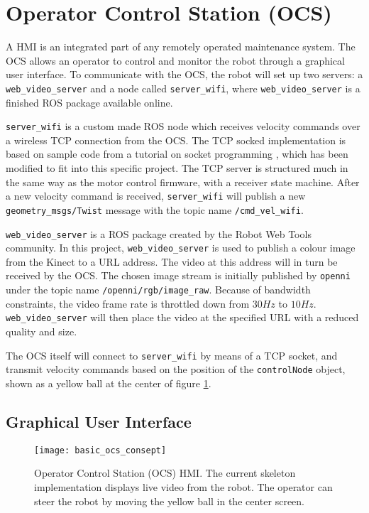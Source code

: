 \section{Operator Control Station (OCS)}

A \ac{HMI} is an integrated part of any remotely operated maintenance system. The \ac{OCS} allows an operator to control and monitor the robot through a graphical user interface. To communicate with the \ac{OCS}, the robot will set up two servers: a \texttt{web\_video\_server} and a node called \texttt{server\_wifi}, where \texttt{web\_video\_server} is a finished \ac{ROS} package available online.

\texttt{server\_wifi} is a custom made \ac{ROS} node which receives velocity commands over a wireless TCP connection from the \ac{OCS}. The TCP socked implementation is based on sample code from a tutorial on socket programming \cite{tcp_tut}, which has been modified to fit into this specific project. The TCP server is structured much in the same way as the motor control firmware, with a receiver state machine. After a new velocity command is received, \texttt{server\_wifi} will publish a new \texttt{geometry\_msgs/Twist} message with the topic name \texttt{/cmd\_vel\_wifi}.

\texttt{web\_video\_server} is a \ac{ROS} package created by the Robot Web Tools community. In this project, \texttt{web\_video\_server} is used to publish a colour image from the Kinect to a URL address. The video at this address will in turn be received by the \ac{OCS}. The chosen image stream is initially published by \texttt{openni} under the topic name \texttt{/openni/rgb/image\_raw}. Because of bandwidth constraints, the video frame rate is throttled down from $30 Hz$ to $10 Hz$.  \texttt{web\_video\_server} will then place the video at the specified URL with a reduced quality and size. 

The \ac{OCS} itself will connect to \texttt{server\_wifi} by means of a TCP socket, and transmit velocity commands based on the position of the \texttt{controlNode} object, shown as a yellow ball at the center of figure \ref{fig:ocs}.

\subsection{Graphical User Interface}

\begin{figure}[H]
	\centering
	\texttt{[image: basic\_ocs\_consept]}
	\caption{Operator Control Station (OCS) \ac{HMI}. The current skeleton implementation displays live video from the robot. The operator can steer the robot by moving the yellow ball in the center screen. }
	\label{fig:ocs}
\end{figure}


